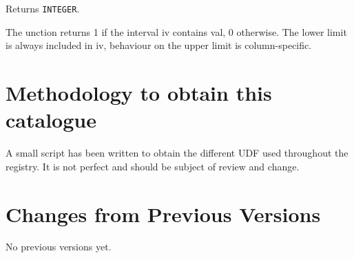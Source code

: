 \documentclass[11pt,a4paper]{ivoa}
\begin{document}
Returns \texttt{INTEGER}.

The unction returns 1 if the interval iv contains val, 0 otherwise. The
lower limit is always included in iv, behaviour on the upper limit is
column-specific.

\appendix

\section{Methodology to obtain this catalogue}

A small script has been written to obtain the different UDF used
throughout the registry. It is not perfect and should be subject of
review and change.



\section{Changes from Previous Versions}

No previous versions yet.  



\end{document}
